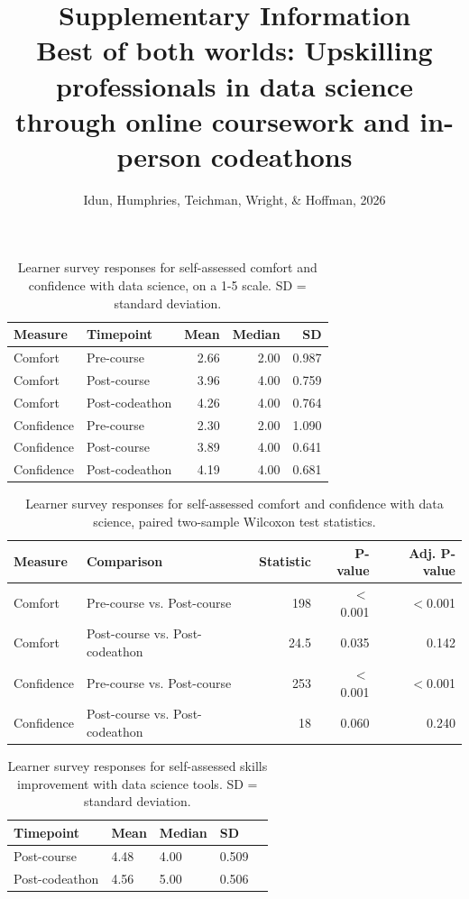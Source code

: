 \documentclass[11pt, oneside]{article}   	%
\title{%
  Supplementary Information \\
  \vspace{7mm}
  \large Best of both worlds: Upskilling professionals in data science through online coursework and in-person codeathons}
\author{Idun, Humphries, Teichman, Wright, \& Hoffman, 2026}
\date{}
\begin{document}
\maketitle
\bigskip


\begin{longtable}[]{@{}llrrr@{}}
\caption{Learner survey responses for self-assessed comfort and confidence with data science, on a 1-5 scale. SD = standard deviation.}\label{tbl-one}\tabularnewline
\toprule\noalign{}
Measure & Timepoint & Mean & Median & SD \\
\midrule\noalign{}
\endhead
\bottomrule\noalign{}
\endlastfoot
Comfort & Pre-course & 2.66 & 2.00 & 0.987 \\
Comfort & Post-course & 3.96 & 4.00 & 0.759 \\
Comfort & Post-codeathon & 4.26 & 4.00 & 0.764 \\
Confidence & Pre-course & 2.30 & 2.00 & 1.090 \\
Confidence & Post-course & 3.89 & 4.00 & 0.641 \\
Confidence & Post-codeathon & 4.19 & 4.00 & 0.681 \\
\end{longtable}

\begin{longtable}[]{@{}llrrr@{}}
\caption{Learner survey responses for self-assessed comfort and confidence with data science, paired two-sample Wilcoxon test statistics.}\label{tbl-two}\tabularnewline
\toprule\noalign{}
Measure & Comparison & Statistic & P-value & Adj. P-value \\
\midrule\noalign{}
\endhead
\bottomrule\noalign{}
\endlastfoot
Comfort & Pre-course vs. Post-course & 198 & $<$0.001 & $<$0.001 \\
Comfort & Post-course vs. Post-codeathon & 24.5 & 0.035 & 0.142 \\
Confidence & Pre-course vs. Post-course & 253 & $<$0.001 & $<$0.001 \\
Confidence & Post-course vs. Post-codeathon & 18 & 0.060 & 0.240 \\
\end{longtable}

\begin{longtable}[]{@{}lllll@{}}
\caption{Learner survey responses for self-assessed skills improvement with data science tools. SD = standard deviation.}\label{tbl-three}\tabularnewline
\toprule\noalign{}
Timepoint & Mean & Median & SD \\
\midrule\noalign{}
\endhead
\bottomrule\noalign{}
\endlastfoot
Post-course & 4.48 & 4.00 & 0.509 \\
Post-codeathon & 4.56 & 5.00 & 0.506 \\
\end{longtable}
\end{document}
